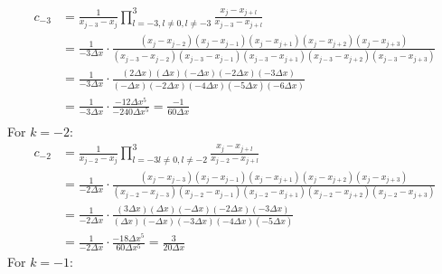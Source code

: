 \begin{equation}
	\begin{aligned}
		c_{-3} & = \frac{1}{x_{j-3} - x_j} \prod_{l=-3, l \neq 0, l \neq -3}^3 \frac{x_j - x_{j+l}}{x_{j-3} - x_{j+l}}                                                                                                                    \\
		       & = \frac{1}{-3\Delta x} \cdot \frac{(x_j - x_{j-2})(x_j - x_{j-1})(x_j - x_{j+1})(x_j - x_{j+2})(x_j - x_{j+3})}{(x_{j-3} - x_{j-2})(x_{j-3} - x_{j-1})(x_{j-3} - x_{j+1})(x_{j-3} - x_{j+2})(x_{j-3} - x_{j+3})} \\
		       & = \frac{1}{-3\Delta x} \cdot \frac{(2\Delta x)(\Delta x)(-\Delta x)(-2\Delta x)(-3\Delta x)}{(-\Delta x)(-2\Delta x)(-4\Delta x)(-5\Delta x)(-6\Delta x)}                                                         \\
		       & = \frac{1}{-3\Delta x} \cdot \frac{-12 \Delta x^5}{-240 \Delta x^5} = \frac{-1}{60\Delta x}                                                                                                                        \\
	\end{aligned}
\end{equation}
For $k=-2$:
\begin{equation}
	\begin{aligned}
		c_{-2} & = \frac{1}{x_{j-2} - x_j} \prod_{l = -3 l \neq 0, l \neq -2}^3 \frac{x_j - x_{j+l}}{x_{j-2} - x_{j+l}}                                                                                                                    \\
		       & = \frac{1}{-2\Delta x} \cdot \frac{(x_j - x_{j-3})(x_j - x_{j-1})(x_j - x_{j+1})(x_j - x_{j+2})(x_j - x_{j+3})}{(x_{j-2} - x_{j-3})(x_{j-2} - x_{j-1})(x_{j-2} - x_{j+1})(x_{j-2} - x_{j+2})(x_{j-2} - x_{j+3})} \\
		       & =  \frac{1}{-2\Delta x} \cdot \frac{(3\Delta x)(\Delta x)(-\Delta x)(-2\Delta x)(-3\Delta x)}{(\Delta x)(-\Delta x)(-3\Delta x)(-4\Delta x)(-5\Delta x)}                                                           \\
		       & = \frac{1}{-2\Delta x} \cdot \frac{-18\Delta x^5}{60 \Delta x^5} = \frac{3}{20\Delta x}
	\end{aligned}
\end{equation}
For $k=-1$:
